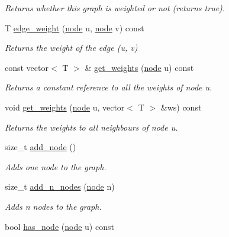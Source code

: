 \begin{DoxyCompactItemize}
\begin{DoxyCompactList}\small\item\em Returns whether this graph is weighted or not (returns true). \end{DoxyCompactList}\item 
T \hyperlink{classlgraph_1_1utils_1_1wxgraph_a1ec5455d64fb001903d3d0d1b5d8c7f2}{edge\+\_\+weight} (\hyperlink{namespacelgraph_1_1utils_ab9c6b34241f0b68372c55f34c460e863}{node} u, \hyperlink{namespacelgraph_1_1utils_ab9c6b34241f0b68372c55f34c460e863}{node} v) const 
\begin{DoxyCompactList}\small\item\em Returns the weight of the edge ({\itshape u}, {\itshape v}) \end{DoxyCompactList}\item 
const vector$<$ T $>$ \& \hyperlink{classlgraph_1_1utils_1_1wxgraph_ab52419fcc456987ee266104de356acc8}{get\+\_\+weights} (\hyperlink{namespacelgraph_1_1utils_ab9c6b34241f0b68372c55f34c460e863}{node} u) const 
\begin{DoxyCompactList}\small\item\em Returns a constant reference to all the weights of node {\itshape u}. \end{DoxyCompactList}\item 
void \hyperlink{classlgraph_1_1utils_1_1wxgraph_a36cc09578d49b326c3573b723536ea33}{get\+\_\+weights} (\hyperlink{namespacelgraph_1_1utils_ab9c6b34241f0b68372c55f34c460e863}{node} u, vector$<$ T $>$ \&ws) const 
\begin{DoxyCompactList}\small\item\em Returns the weights to all neighbours of node {\itshape u}. \end{DoxyCompactList}\item 
size\+\_\+t \hyperlink{classlgraph_1_1utils_1_1xxgraph_af41baf2c098e872731ad646aeec1b382}{add\+\_\+node} ()
\begin{DoxyCompactList}\small\item\em Adds one node to the graph. \end{DoxyCompactList}\item 
size\+\_\+t \hyperlink{classlgraph_1_1utils_1_1xxgraph_af4f3782c1a55f73c6f34f2f2c26fb404}{add\+\_\+n\+\_\+nodes} (\hyperlink{namespacelgraph_1_1utils_ab9c6b34241f0b68372c55f34c460e863}{node} n)
\begin{DoxyCompactList}\small\item\em Adds {\itshape n} nodes to the graph. \end{DoxyCompactList}\item 
bool \hyperlink{classlgraph_1_1utils_1_1xxgraph_a026ab064c2be26790cc1f547be2157c9}{has\+\_\+node} (\hyperlink{namespacelgraph_1_1utils_ab9c6b34241f0b68372c55f34c460e863}{node} u) const \hypertarget{classlgraph_1_1utils_1_1xxgraph_a026ab064c2be26790cc1f547be2157c9}{}\label{classlgraph_1_1utils_1_1xxgraph_a026ab064c2be26790cc1f547be2157c9}


\end{DoxyCompactItemize}

